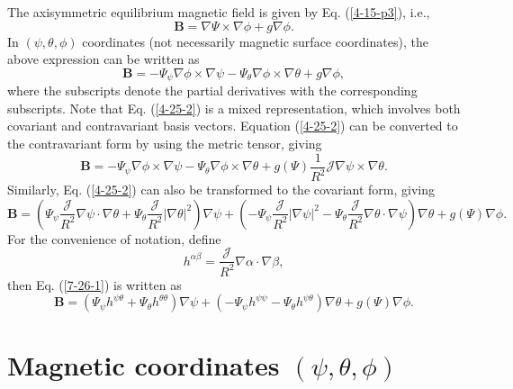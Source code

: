 \documentclass{article}
\begin{document}
The axisymmetric equilibrium magnetic field is given by Eq. (\ref{4-15-p3}),
i.e.,
\begin{equation}
  \label{4-25-1} \mathbf{B}= \nabla \Psi \times \nabla \phi + g \nabla \phi .
\end{equation}
In $(\psi, \theta, \phi)$ coordinates (not necessarily magnetic surface
coordinates), the above expression can be written as
\begin{equation}
  \label{4-25-2} \mathbf{B}= - \Psi_{\psi} \nabla \phi \times \nabla \psi -
  \Psi_{\theta} \nabla \phi \times \nabla \theta + g \nabla \phi,
\end{equation}
where the subscripts denote the partial derivatives with the corresponding
subscripts. Note that Eq. (\ref{4-25-2}) is a mixed representation, which
involves both covariant and contravariant basis vectors. Equation
(\ref{4-25-2}) can be converted to the contravariant form by using the metric
tensor, giving
\begin{equation}
  \label{3-13-p10} \mathbf{B}= - \Psi_{\psi} \nabla \phi \times \nabla \psi -
  \Psi_{\theta} \nabla \phi \times \nabla \theta + g (\Psi) \frac{1}{R^2}
  \mathcal{J} \nabla \psi \times \nabla \theta .
\end{equation}
Similarly, Eq. (\ref{4-25-2}) can also be transformed to the covariant form,
giving
\begin{equation}
  \label{7-26-1} \mathbf{B}= \left( \Psi_{\psi} \frac{\mathcal{J}}{R^2} \nabla
  \psi \cdot \nabla \theta + \Psi_{\theta} \frac{\mathcal{J}}{R^2} | \nabla
  \theta |^2 \right) \nabla \psi + \left( - \Psi_{\psi}
  \frac{\mathcal{J}}{R^2} | \nabla \psi |^2 - \Psi_{\theta}
  \frac{\mathcal{J}}{R^2} \nabla \theta \cdot \nabla \psi \right) \nabla
  \theta + g (\Psi) \nabla \phi .
\end{equation}
For the convenience of notation, define
\begin{equation}
  \label{4-25-e20} h^{\alpha \beta} = \frac{\mathcal{J}}{R^2} \nabla \alpha
  \cdot \nabla \beta,
\end{equation}
then Eq. (\ref{7-26-1}) is written as
\begin{equation}
  \label{4-16-1} \mathbf{B}= (\Psi_{\psi} h^{\psi \theta} + \Psi_{\theta}
  h^{\theta \theta}) \nabla \psi + (- \Psi_{\psi} h^{\psi \psi} -
  \Psi_{\theta} h^{\psi \theta}) \nabla \theta + g (\Psi) \nabla \phi .
\end{equation}

\section{Magnetic coordinates $(\psi, \theta, \phi)$}
\end{document}
